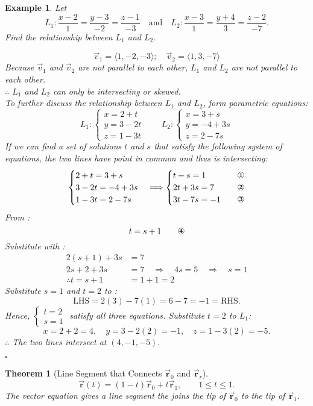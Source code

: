 \documentclass[12pt,a4paper]{article}
\newtheorem{thm}{Theorem}[subsection]
\newtheorem{eg}{Example}[subsection]
\newenvironment*{ans}{\par\indent{\textit{Answer. }}\par}{\par\hfill{$\square$}\par}
\def\vecv{\vec{v}}
\def\vecr{\vec{\boldsymbol{\textbf{r}}}}
\begin{document}
\begin{eg}
	Let \[L_1: \frac{x-2}{1}=\frac{y-3}{-2}=\frac{z-1}{-3}\quad\text{and}\quad L_2: \frac{x-3}{1}=\frac{y+4}{3}=\frac{z-2}{-7}.\] Find the relationship between $L_1$ and $L_2$.
	\begin{ans}
		\[\vecv_1=\langle1,-2,-3\rangle;\quad\vecv_2=\langle1,3,-7\rangle\]	 Because $\vecv_1$ and $\vecv_2$ are not parallel to each other, $L_1$ and $L_2$ are not parallel to each other. \\
		$\therefore$ $L_1$ and $L_2$ can only be intersecting or skewed. \\ 
		To further discuss the relationship between $L_1$ and $L_2$, form parametric equations: 
		\[L_1: \begin{cases}x=2+t\\y=3-2t\\z=1-3t\end{cases}\qquad L_2: \begin{cases}x=3+s\\y=-4+3s\\z=2-7s\end{cases}\]
		If we can find a set of solutions $t$ and $s$ that satisfy the following system of equations, the two lines have point in common and thus is intersecting: \[\begin{cases}2+t=3+s\\3-2t=-4+3s\\1-3t=2-7s\end{cases}\Longrightarrow\begin{cases}t-s=1\quad&\text{\ding{172}}\\2t+3s=7\quad&\text{\ding{173}}\\3t-7s=-1\quad&\text{\ding{174}}\end{cases}\]
		From : \[t=s+1\qquad\text{\ding{175}}\]
		Substitute  with : $$\begin{aligned}
			2(s+1)+3s&=7\\
			2s+2+3s&=7\quad\Rightarrow\quad4s=5\quad\Rightarrow\quad s=1\\
			\therefore t=s+1&=1+1=2
		\end{aligned}$$
		Substitute $s=1$ and $t=2$ to : \[\text{LHS}=2(3)-7(1)=6-7=-1=\text{RHS}.\]
		Hence, $\begin{cases}t=2\\s=1\end{cases}$ satisfy all three equations. Substitute $t=2$ to $L_1$: \[x=2+2=4,\quad y=3-2(2)=-1,\quad z=1-3(2)=-5.\]
		$\therefore$ The two lines intersect at $(4,-1,-5).$
	\end{ans}
\end{eg}
\begin{thm}[Line Segment that Connects $\vecr_0$ and $\vecr_r$]
\[\vecr(t)=(1-t)\vecr_0+t\vecr_1,\qquad1\leq t\leq1.\] The vector equation gives a line segment the joins the tip of $\vecr_0$ to the tip of $\vecr_1.$
\end{thm}
\end{document}
